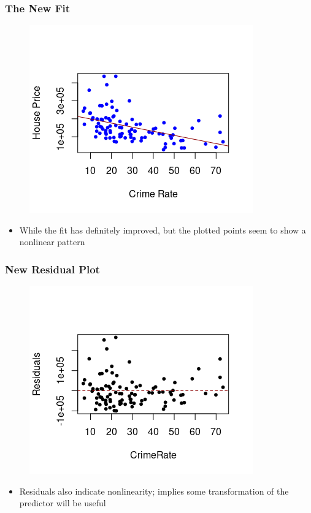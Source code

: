 \documentclass[10pt]{beamer}
\theoremstyle{plain}
\begin{document}
\begin{frame}
\frametitle{\sc The New Fit}
    \begin{figure}[!ht]
		\centering
		\includegraphics[scale=0.7]{figs8/scatter-reg-new.png}
	\end{figure}
\begin{itemize}
\item While the fit has definitely improved, but the plotted points seem to show a nonlinear pattern
\end{itemize}	
	
\end{frame}


\begin{frame}
\frametitle{\sc New Residual Plot}
    \begin{figure}[!ht]
		\centering
		\includegraphics[scale=0.7]{figs8/residual-new.png}
	\end{figure}
\begin{itemize}
\item Residuals also indicate nonlinearity; implies some transformation of the predictor will be useful
\end{itemize}	
\end{frame}
\end{document}
